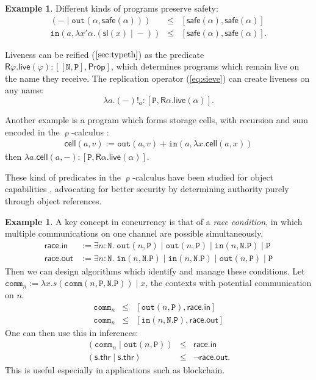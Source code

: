 \documentclass[conference]{IEEEtran}
\theoremstyle{definition}
\newtheorem{example}[theorem]{Example}
\newcommand{\msf}[1]{\mathsf{#1}}
\newcommand{\mtt}[1]{\mathtt{#1}}
\newcommand{\Prop}{\msf{Prop}}
\newcommand{\N}{\mtt{N}}
\newcommand{\PP}{\mtt{P}}
\newcommand{\tto}{\mtt{out}}
\newcommand{\tti}{\mtt{in}}
\begin{document}
\begin{example}
    Different kinds of programs preserve safety:
    \[\begin{array}{lcl}
        (- \;|\; \tto(\alpha,\msf{safe}(\alpha))) & \leq & [\msf{safe}(\alpha),\msf{safe}(\alpha)]\\
        \tti(a,\lambda x'\alpha.(\msf{sl}(x) \;|\; -)) & \leq & [\msf{safe}(\alpha),\msf{safe}(\alpha)].
    \end{array}\]
    
    Liveness can be reified ($\ref{sec:typeth}$) as the predicate $\msf{R}\varphi.\msf{live}(\varphi):[[\N,\PP],\Prop]$, which determines programs which remain live on the name they receive. The replication operator (\ref{eq:sieve}) can create liveness on any name:
    \[ \lambda a.(-)!_{a}:[\PP, \msf{R}\alpha.\msf{live}(\alpha)].\]

    Another example is a program which forms storage cells, with recursion and sum encoded in the $\uprho$-calculus \cite{rhocal}:
    \[\begin{array}{c}
        \msf{cell}(a,v):= \tto(a,v) + \tti(a, \lambda x.\msf{cell}(a,x))
    \end{array}\]
    then $\lambda a.\msf{cell}(a,-):[\PP,\msf{R}\alpha.\msf{live}(\alpha)].$
\end{example}
    

These kind of predicates in the $\uprho$-calculus have been studied for object capabilities \cite{ocaps}, advocating for better security by determining authority purely through object references.

\begin{example}
    A key concept in concurrency is that of a \textit{race condition}, in which multiple communications on one channel are possible simultaneously.
    \[\begin{array}{ll}
        \msf{race.in} & := \exists n:\N.\; \tto(n,\PP)\;|\;\tto(n,\PP)\;|\;\tti(n,\N.\PP)\;|\;\PP\\
        \msf{race.out} & := \exists n:\N.\; \tti(n,\N.\PP)\;|\;\tti(n,\N.\PP)\;|\;\tto(n,\PP) \;|\; \PP
    \end{array}\]
    Then we can design algorithms which identify and manage these conditions. Let $\mtt{comm}_n:= \lambda x. s(\mtt{comm}(n,\PP,\N.\PP))\;|\; x$, the contexts with potential communication on $n$.
    \[\begin{array}{lcl}
        \mtt{comm}_n & \leq & [\tto(n,\PP),\msf{race.in}]\\
        \mtt{comm}_n & \leq & [\tti(n,\N.\PP),\msf{race.out}]
    \end{array}\]
    One can then use this in inferences:
    \[\begin{array}{lcl}
         (\mtt{comm}_n \;|\; \tto(n,\PP)) & \leq & \msf{race.in}\\
         (\msf{s.thr} \;|\; \msf{s.thr}) & \leq & \neg\msf{race.out}.
    \end{array}\]
    This is useful especially in applications such as blockchain.
\end{example}
\end{document}
